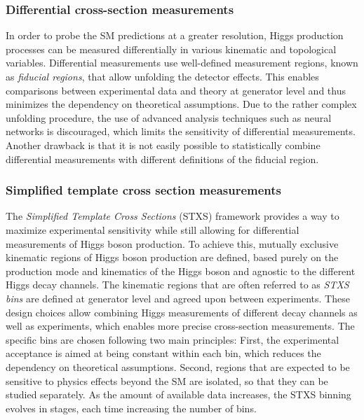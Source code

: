 \subsubsection{Differential cross-section measurements}
In order to probe the SM predictions at a greater resolution, Higgs production processes can be measured differentially in various kinematic and topological variables.
Differential measurements use well-defined measurement regions, known as \emph{fiducial regions}, that allow unfolding the detector effects. 
This enables comparisons between experimental data and theory at generator level and thus minimizes the dependency on theoretical assumptions. 
Due to the rather complex unfolding procedure, the use of advanced analysis techniques such as neural networks is discouraged, which limits the sensitivity of differential measurements.
Another drawback is that it is not easily possible to statistically combine differential measurements with different definitions of the fiducial region.  


\subsubsection{Simplified template cross section measurements}
The \emph{Simplified Template Cross Sections} (STXS) framework provides a way to maximize experimental sensitivity while still allowing for differential measurements of Higgs boson production.
To achieve this, mutually exclusive kinematic regions of Higgs boson production are defined, based purely on the production mode and kinematics of the Higgs boson and agnostic to the different Higgs decay channels. The kinematic regions that are often referred to as \emph{STXS bins} are defined at generator level and agreed upon between experiments.
These design choices allow combining Higgs measurements of different decay channels as well as experiments, which enables more precise cross-section measurements.
The specific bins are chosen following two main principles: First, the experimental acceptance is aimed at being constant within each bin, which reduces the dependency on theoretical assumptions. Second, regions that are expected to be sensitive to physics effects beyond the SM are isolated, so that they can be studied separately.
As the amount of available data increases, the STXS binning evolves in stages, each time increasing the number of bins. 

